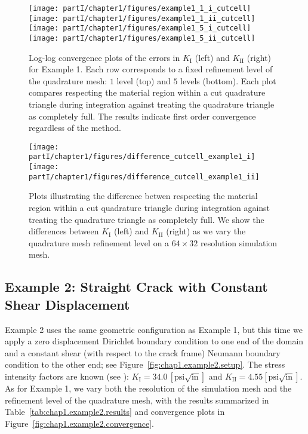 \setlength{\figurewidth}{0.49\textwidth}
\begin{figure}[htbp]
\centering
\texttt{[image: partI/chapter1/figures/example1\_1\_i\_cutcell]}
\texttt{[image: partI/chapter1/figures/example1\_1\_ii\_cutcell]} \\
\texttt{[image: partI/chapter1/figures/example1\_5\_i\_cutcell]}
\texttt{[image: partI/chapter1/figures/example1\_5\_ii\_cutcell]}
\caption{Log-log convergence plots of the errors in $K_{\text{I}}$ (left) and $K_{\text{II}}$ (right) for Example 1. Each row corresponds to a fixed refinement level of the quadrature mesh: $1$ level (top) and $5$ levels (bottom). Each plot compares respecting the material region within a cut quadrature triangle during integration against treating the quadrature triangle as completely full. The results indicate first order convergence regardless of the method.}
\label{fig:chap1.cut_nocut.convergence}
\end{figure}

\setlength{\figurewidth}{0.49\textwidth}
\begin{figure}[htbp]
\centering
\texttt{[image: partI/chapter1/figures/difference\_cutcell\_example1\_i]}
\texttt{[image: partI/chapter1/figures/difference\_cutcell\_example1\_ii]}
\caption{Plots illustrating the difference betwen respecting the material region within a cut quadrature triangle during integration against treating the quadrature triangle as completely full. We show the differences between $K_{\text{I}}$ (left) and $K_{\text{II}}$ (right) as we vary the quadrature mesh refinement level on a $64 \times 32$ resolution simulation mesh.}
\label{fig:chap1.cut_nocut.diff}
\end{figure}

\subsection{Example 2: Straight Crack with Constant Shear Displacement}

Example 2 uses the same geometric configuration as Example 1, but this time we apply a zero displacement Dirichlet boundary condition to one end of the domain and a constant shear (with respect to the crack frame) Neumann boundary condition to the other end; see Figure~\ref{fig:chap1.example2.setup}. The stress intensity factors are known (see \cite{Moes99}): $K_{\text{I}} = 34.0 \, [\text{psi}\sqrt{\text{in}}]$ and $K_{\text{II}} = 4.55 [\text{psi}\sqrt{\text{in}}]$. As for Example 1, we vary both the resolution of the simulation mesh and the refinement level of the quadrature mesh, with the results summarized in Table~\ref{tab:chap1.example2.results} and convergence plots in Figure~\ref{fig:chap1.example2.convergence}.

